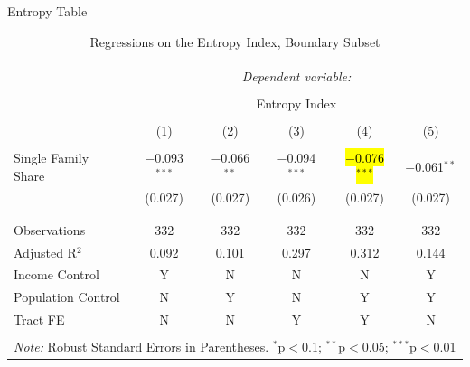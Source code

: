 \documentclass{beamer}
\makeatletter
\let\HL\hl
\renewcommand\hl{%
  \let\set@color\beamerorig@set@color
  \let\reset@color\beamerorig@reset@color
  \HL}
\makeatother
\begin{document}
\begin{frame}{Entropy Table}
\tiny
\begin{table}[!htbp] \centering 

  \caption{Regressions on the Entropy Index, Boundary Subset} 
  \label{tab:Entropy_Causal} 
\begin{tabular}{@{\extracolsep{5pt}}lccccc} 
\\[-1.8ex]\hline 
\hline \\[-1.8ex] 
 & \multicolumn{5}{c}{\textit{Dependent variable:}} \\ 
\cline{2-6} 
\\[-1.8ex] & \multicolumn{5}{c}{Entropy Index} \\ 
\\[-1.8ex] & (1) & (2) & (3) & (4) & (5)\\ 
\hline \\[-1.8ex] 
 Single Family Share & $-$0.093$^{***}$ & $-$0.066$^{**}$ & $-$0.094$^{***}$ & \hl{$-$0.076$^{***}$} & $-$0.061$^{**}$ \\ 
  & (0.027) & (0.027) & (0.026) & (0.027) & (0.027) \\ 
  & & & & & \\ 
\hline \\[-1.8ex] 
Observations & 332 & 332 & 332 & 332 & 332 \\ 
Adjusted R$^{2}$ & 0.092 & 0.101 & 0.297 & 0.312 & 0.144 \\ 
\hline
Income Control & Y & N & N & N & Y\\
Population Control & N & Y & N & Y & Y\\
Tract FE & N & N & Y & Y & N\\
\hline 
\hline \\[-1.8ex] 
\multicolumn{6}{l}{\textit{Note:} Robust Standard Errors in Parentheses. $^{*}$p$<$0.1; $^{**}$p$<$0.05; $^{***}$p$<$0.01} \\
\end{tabular} 
\end{table} 

    
\end{frame}
\end{document}
